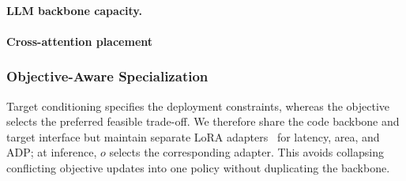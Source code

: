 \paragraph{LLM backbone capacity.}




\paragraph{Cross-attention placement}




\subsubsection{Objective-Aware Specialization}
\label{subsubsec:peft}

Target conditioning specifies the deployment constraints, whereas the objective selects the preferred feasible trade-off. We therefore share
the code backbone and target interface but maintain separate LoRA adapters~\cite{hu2022lora} for latency, area, and ADP; at inference, $o$ selects the corresponding adapter. This avoids collapsing conflicting objective updates into one policy without duplicating the backbone.


